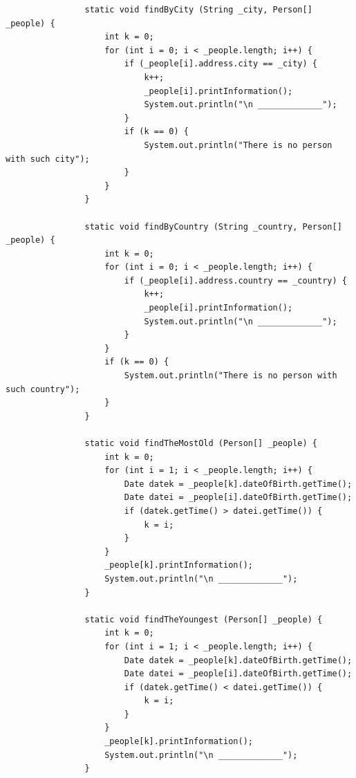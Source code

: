 \documentclass[a4paper]{article}
\begin{document}
\begin{enumerate}
\begin{lstlisting}
                static void findByCity (String _city, Person[] _people) {
                    int k = 0;
                    for (int i = 0; i < _people.length; i++) {
                        if (_people[i].address.city == _city) {
                            k++;
                            _people[i].printInformation();
                            System.out.println("\n _____________");
                        } 
                        if (k == 0) {
                            System.out.println("There is no person with such city");
                        }
                    }
                }
            
                static void findByCountry (String _country, Person[] _people) {
                    int k = 0;
                    for (int i = 0; i < _people.length; i++) {
                        if (_people[i].address.country == _country) {
                            k++;
                            _people[i].printInformation();
                            System.out.println("\n _____________");
                        } 
                    }
                    if (k == 0) {
                        System.out.println("There is no person with such country");
                    }
                }
            
                static void findTheMostOld (Person[] _people) {
                    int k = 0;
                    for (int i = 1; i < _people.length; i++) {
                        Date datek = _people[k].dateOfBirth.getTime();
                        Date datei = _people[i].dateOfBirth.getTime();
                        if (datek.getTime() > datei.getTime()) {
                            k = i;
                        }
                    }
                    _people[k].printInformation();
                    System.out.println("\n _____________");
                }
            
                static void findTheYoungest (Person[] _people) {
                    int k = 0;
                    for (int i = 1; i < _people.length; i++) {
                        Date datek = _people[k].dateOfBirth.getTime();
                        Date datei = _people[i].dateOfBirth.getTime();
                        if (datek.getTime() < datei.getTime()) {
                            k = i;
                        }
                    }
                    _people[k].printInformation();
                    System.out.println("\n _____________");
                }
            

\end{lstlisting}
\end{enumerate}
\end{document}
